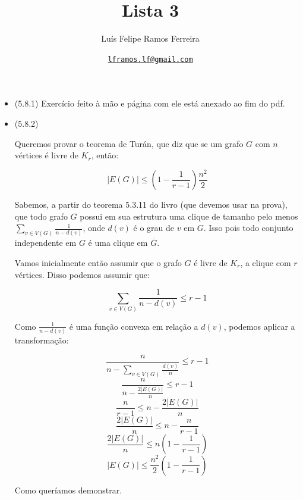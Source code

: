 \documentclass{article}
\title{Lista 3}
\author{Luís Felipe Ramos Ferreira}
\date{\href{mailto:lframos.lf@gmail.com}{\texttt{lframos.lf@gmail.com}}
}
\begin{document}
\maketitle

\begin{itemize}
	\item (5.8.1) Exercício feito à mão e página com ele está anexado ao fim do pdf.

	\item (5.8.2)

	      Queremos provar o teorema de Turán, que diz que se um grafo \(G\) com \(n\) vértices é livre de \(K_r\), então:

	      \[|E(G)| \leq (1 - \frac{1}{r-1})\frac{n^2}{2}\]

	      Sabemos, a partir do teorema 5.3.11 do livro (que devemos usar na prova), que todo grafo \(G\) possui em sua estrutura uma clique de tamanho pelo menos \(\sum_{v \in V(G)} \frac{1}{n - d(v)}\),
	      onde \(d(v)\) é o grau de \(v\) em \(G\). Isso pois todo conjunto independente em \(G\) é uma clique em \(\overline{G}\).

	      Vamos inicialmente então assumir que o grafo \(G\) é livre de \(K_r\), a clique com \(r\) vértices. Disso podemos assumir que:

	      \[\sum_{v \in V(G)} \frac{1}{n - d(v)} \leq r -1\]

	      Como \(\frac{1}{n - d(v)}\) é uma função convexa em relação a \(d(v)\), podemos aplicar a transformação:

	      \[\frac{n}{n - \sum_{v \in V(G)} \frac{d(v)}{n}} \leq r - 1\]
	      \[\frac{n}{n - \frac{2 |E(G)|}{n}} \leq r - 1\]
	      \[\frac{n}{r - 1} \leq n - \frac{2 |E(G)|}{n}\]
	      \[\frac{2 |E(G)|}{n} \leq n - \frac{n}{r - 1}\]
	      \[\frac{2 |E(G)|}{n} \leq n (1 - \frac{1}{r - 1})\]
	      \[|E(G)| \leq \frac{n^2}{2} (1 - \frac{1}{r - 1})\]

	      Como queríamos demonstrar.



\end{itemize}
\end{document}

